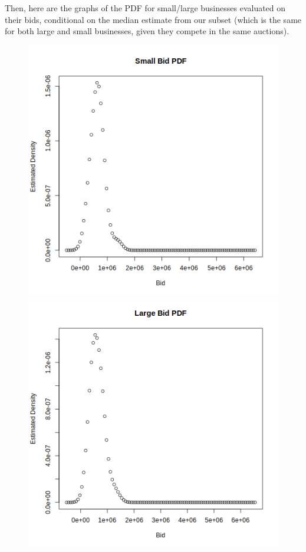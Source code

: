 \newpage
Then, here are the graphs of the PDF for small/large businesses evaluated on their
bids, conditional on the median estimate from our subset (which is the same
for both large and small businesses, given they compete in the same auctions).
\begin{figure}[ht!]
\includegraphics[scale=0.5]{imgs/g_s_median.png}
\includegraphics[scale=0.5]{imgs/g_l_median.png}
\end{figure}

